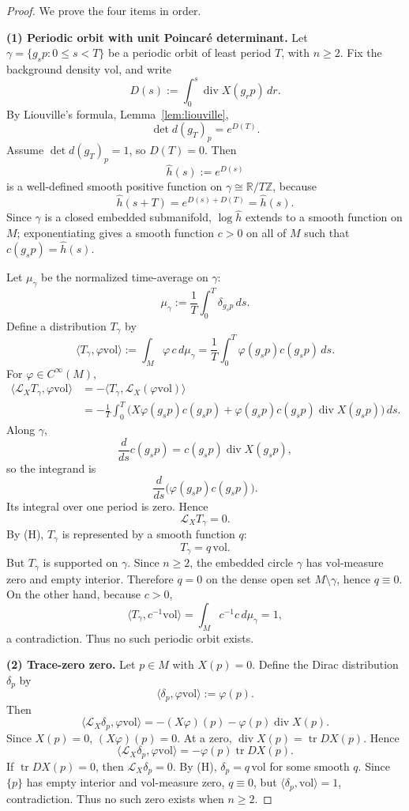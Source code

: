 \documentclass[12pt]{article}
\theoremstyle{definition}
\newcommand{\R}{\mathbb{R}}
\newcommand{\Z}{\mathbb{Z}}
\newcommand{\vol}{\mathrm{vol}}
\DeclareMathOperator{\Div}{div}
\DeclareMathOperator{\tr}{tr}
\begin{document}
\begin{proof}
We prove the four items in order.

\medskip\noindent\textbf{(1) Periodic orbit with unit Poincar\'e determinant.}
Let \(\gamma=\{g_s p:0\le s<T\}\) be a periodic orbit of least period \(T\), with \(n\ge 2\).  Fix the background density \(\vol\), and write
\[
D(s):=\int_0^s \Div X(g_r p)\,dr .
\]
By Liouville's formula, Lemma~\ref{lem:liouville},
\[
\det d(g_T)_p=e^{D(T)}.
\]
Assume \(\det d(g_T)_p=1\), so \(D(T)=0\).  Then
\[
\widehat h(s):=e^{D(s)}
\]
is a well-defined smooth positive function on \(\gamma\cong \R/T\Z\), because
\[
\widehat h(s+T)=e^{D(s)+D(T)}=\widehat h(s).
\]
Since \(\gamma\) is a closed embedded submanifold, \(\log \widehat h\) extends to a smooth function on \(M\); exponentiating gives a smooth function \(c>0\) on all of \(M\) such that \(c(g_s p)=\widehat h(s)\).

Let \(\mu_\gamma\) be the normalized time-average on \(\gamma\):
\[
\mu_\gamma:=\frac1T\int_0^T \delta_{g_s p}\,ds .
\]
Define a distribution \(T_\gamma\) by
\[
\langle T_\gamma,\varphi\vol\rangle
:=
\int_M \varphi\,c\,d\mu_\gamma
=
\frac1T\int_0^T \varphi(g_s p)c(g_s p)\,ds .
\]
For \(\varphi\in C^\infty(M)\),
\[
\begin{aligned}
\langle \mathcal L_X T_\gamma,\varphi\vol\rangle
&=
-\langle T_\gamma,\mathcal L_X(\varphi\vol)\rangle \\
&=
-\frac1T\int_0^T
\bigl(X\varphi(g_s p)c(g_s p)+\varphi(g_s p)c(g_s p)\Div X(g_s p)\bigr)\,ds .
\end{aligned}
\]
Along \(\gamma\),
\[
\frac{d}{ds}c(g_s p)=c(g_s p)\Div X(g_s p),
\]
so the integrand is
\[
\frac{d}{ds}\bigl(\varphi(g_s p)c(g_s p)\bigr).
\]
Its integral over one period is zero.  Hence
\[
\mathcal L_X T_\gamma=0.
\]
By (H), \(T_\gamma\) is represented by a smooth function \(q\):
\[
T_\gamma=q\,\vol .
\]
But \(T_\gamma\) is supported on \(\gamma\).  Since \(n\ge 2\), the embedded circle \(\gamma\) has \(\vol\)-measure zero and empty interior.  Therefore \(q=0\) on the dense open set \(M\setminus\gamma\), hence \(q\equiv 0\).  On the other hand, because \(c>0\),
\[
\langle T_\gamma,c^{-1}\vol\rangle
=
\int_M c^{-1}c\,d\mu_\gamma
=
1,
\]
a contradiction.  Thus no such periodic orbit exists.

\medskip\noindent\textbf{(2) Trace-zero zero.}
Let \(p\in M\) with \(X(p)=0\).  Define the Dirac distribution \(\delta_p\) by
\[
\langle \delta_p,\varphi\vol\rangle:=\varphi(p).
\]
Then
\[
\langle \mathcal L_X\delta_p,\varphi\vol\rangle
=
-(X\varphi)(p)-\varphi(p)\Div X(p).
\]
Since \(X(p)=0\), \((X\varphi)(p)=0\).  At a zero, \(\Div X(p)=\tr DX(p)\).  Hence
\[
\langle \mathcal L_X\delta_p,\varphi\vol\rangle
=
-\varphi(p)\tr DX(p).
\]
If \(\tr DX(p)=0\), then \(\mathcal L_X\delta_p=0\).  By (H), \(\delta_p=q\,\vol\) for some smooth \(q\).  Since \(\{p\}\) has empty interior and \(\vol\)-measure zero, \(q\equiv 0\), but \(\langle\delta_p,\vol\rangle=1\), contradiction.  Thus no such zero exists when \(n\ge 2\).


\end{proof}
\end{document}
